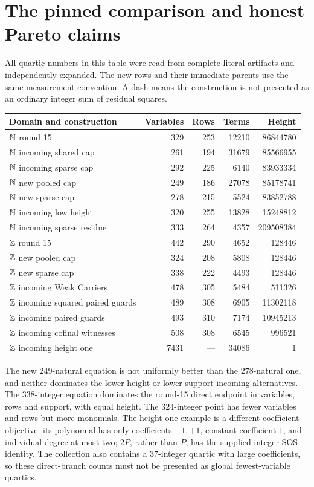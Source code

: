 \section{The pinned comparison and honest Pareto claims}
All quartic numbers in this table were read from complete literal artifacts and independently expanded. The new rows and their immediate parents use the same measurement convention. A dash means the construction is not presented as an ordinary integer sum of residual squares.
\begin{center}\small
\begin{tabular}{@{}lrrrr@{}}\toprule
Domain and construction&Variables&Rows&Terms&Height\\\midrule
$\mathbb N$ round 15&329&253&12210&86844780\\
$\mathbb N$ incoming shared cap&261&194&31679&85566955\\
$\mathbb N$ incoming sparse cap&292&225&6140&83933334\\
$\mathbb N$ new pooled cap&249&186&27078&85178741\\
$\mathbb N$ new sparse cap&278&215&5524&83852788\\
$\mathbb N$ incoming low height&320&255&13828&15248812\\
$\mathbb N$ incoming sparse residue&333&264&4357&209508384\\\midrule
$\mathbb Z$ round 15&442&290&4652&128446\\
$\mathbb Z$ new pooled cap&324&208&5808&128446\\
$\mathbb Z$ new sparse cap&338&222&4493&128446\\
$\mathbb Z$ incoming Weak Carriers&478&305&5484&511326\\
$\mathbb Z$ incoming squared paired guards&489&308&6905&11302118\\
$\mathbb Z$ incoming paired guards&493&310&7174&10945213\\
$\mathbb Z$ incoming cofinal witnesses&508&308&6545&996521\\
$\mathbb Z$ incoming height one&7431&---&34086&1\\\bottomrule
\end{tabular}\end{center}
The new $249$-natural equation is not uniformly better than the $278$-natural one, and neither dominates the lower-height or lower-support incoming alternatives. The $338$-integer equation dominates the round-15 direct endpoint in variables, rows and support, with equal height. The $324$-integer point has fewer variables and rows but more monomials. The height-one example is a different coefficient objective: its polynomial has only coefficients $-1,+1$, constant coefficient $1$, and individual degree at most two; $2P$, rather than $P$, has the supplied integer SOS identity. The collection also contains a $37$-integer quartic with large coefficients, so these direct-branch counts must not be presented as global fewest-variable quartics.

